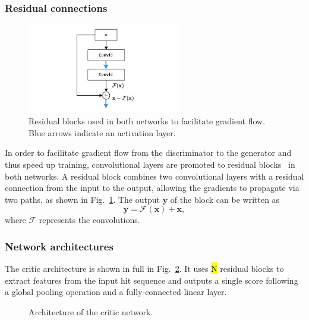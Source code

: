 \subsubsection{Residual connections}
\begin{figure}
    \centering
    \includegraphics[width=0.6\textwidth]{chapter4/residual_sel.drawio.pdf}
    \caption{Residual blocks used in both networks to facilitate gradient flow. Blue arrows indicate an activation layer.}
    \label{fig:residual_block}
\end{figure}
In order to facilitate gradient flow from the discriminator to the generator and thus speed up training, convolutional layers are promoted to residual blocks~\cite{he2016deep} in both networks. A residual block combines two convolutional layers with a residual connection from the input to the output, allowing the gradients to propagate via two paths, as shown in Fig.~\ref{fig:residual_block}. The output $\mathbf{y}$ of the block can be written as
\begin{equation*}
    \mathbf{y} = \mathcal{F}(\mathbf{x}) + \mathbf{x},
\end{equation*}
where $\mathcal{F}$ represents the convolutions. %
    
    
\subsubsection{Network architectures}

The critic architecture is shown in full in Fig.~\ref{fig:disc_arch}. It uses \hl{N} residual blocks to extract features from the input hit sequence and outputs a single score following a global pooling operation and a fully-connected linear layer.

\begin{figure}
    \centering
    \caption{Architecture of the critic network.}
    \label{fig:disc_arch}
\end{figure}

